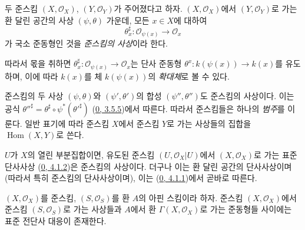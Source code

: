 \begin{definition}[2.2.1]
\label{I.2.2.1-ko}
두 준스킴 $(X,\mathscr{O}_X)$, $(Y,\mathscr{O}_Y)$가 주어졌다고 하자.
$(X,\mathscr{O}_X)$에서 $(Y,\mathscr{O}_Y)$로 가는 환 달린 공간의
사상 $(\psi,\theta)$ 가운데, 모든 $x\in X$에 대하여
\[
  \theta_x^\sharp:\mathscr{O}_{\psi(x)}\longrightarrow\mathscr{O}_x
\]
가 국소 준동형인 것을 \emph{준스킴의 사상}이라 한다.
\end{definition}


따라서 몫을 취하면
$\theta_x^\sharp:\mathscr{O}_{\psi(x)}\to\mathscr{O}_x$는 단사 준동형
$\theta^x:k(\psi(x))\to k(x)$를 유도하며, 이에 따라 $k(x)$를 체
$k(\psi(x))$의 \emph{확대체}로 볼 수 있다.

\begin{env}[2.2.2]
\label{I.2.2.2-ko}
준스킴의 두 사상 $(\psi,\theta)$와 $(\psi',\theta')$의 합성
$(\psi'',\theta'')$도 준스킴의 사상이다. 이는 공식
${\theta''}^\sharp=\theta^\sharp\circ\psi^*({\theta'}^\sharp)$
(\hyperref[0.3.5.5-ko]{0, 3.5.5})에서 따른다. 따라서 준스킴들은 하나의
\emph{범주}를 이룬다. 일반 표기에 따라 준스킴 $X$에서 준스킴 $Y$로
가는 사상들의 집합을 $\operatorname{Hom}(X,Y)$로 쓴다.
\end{env}

\begin{example}[2.2.3]
\label{I.2.2.3-ko}
$U$가 $X$의 열린 부분집합이면, 유도된 준스킴
$(U,\mathscr{O}_X|U)$에서 $(X,\mathscr{O}_X)$로 가는 표준 단사사상
(\hyperref[0.4.1.2-ko]{0, 4.1.2})은 준스킴의 사상이다. 더구나 이는
환 달린 공간의 단사사상이며(따라서 특히 준스킴의 단사사상이며),
이는 (\hyperref[0.4.1.1-ko]{0, 4.1.1})에서 곧바로 따른다.
\end{example}

\begin{proposition}[2.2.4]
\label{I.2.2.4-ko}
$(X,\mathscr{O}_X)$를 준스킴, $(S,\mathscr{O}_S)$를 환 $A$의 아핀
스킴이라 하자. 준스킴 $(X,\mathscr{O}_X)$에서 준스킴
$(S,\mathscr{O}_S)$로 가는 사상들과 $A$에서 환
$\Gamma(X,\mathscr{O}_X)$로 가는 준동형들 사이에는 표준 전단사 대응이
존재한다.
\end{proposition}


